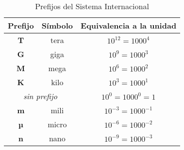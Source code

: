 \documentclass[12pt]{article}
\begin{document}
\begin{table}[h]

    \centering

    \caption{Prefijos del Sistema Internacional}
    \label{tablaPrefijoSI}

    \begin{tabular}{ | c | c | c | }
        \hline
        Prefijo & Símbolo & Equivalencia a la unidad \\
        \hline
        \textbf{T} & tera & $10^{12}=1000^{4}$ \\
        \hline
        \textbf{G} & giga & $10^{9}=1000^{3}$ \\
        \hline
        \textbf{M} & mega & $10^{6}=1000^{2}$ \\
        \hline
        \textbf{K} & kilo & $10^{3}=1000^{1}$ \\
        \hline
        \multicolumn{2}{|c|}{\emph{sin prefijo}} & $10^{0}=1000^{0}=1$ \\
        \hline
        \textbf{m} & mili & $10^{-3}=1000^{-1}$ \\
        \hline
        \textbf{µ} & micro & $10^{-6}=1000^{-2}$ \\
        \hline
        \textbf{n} & nano & $10^{-9}=1000^{-3}$ \\
        \hline
    \end{tabular}

\end{table}
\end{document}
